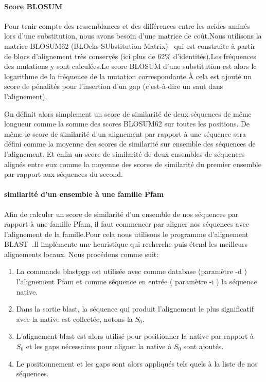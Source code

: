\paragraph{Score BLOSUM}

Pour tenir compte des ressemblances et des différences entre les acides aminés lors d'une substitution, nous avons besoin d'une matrice de coût.Nous utilisons la matrice BLOSUM62 (BLOcks SUbstitution Matrix)~\citep{refBLOSUM} qui est construite à partir de blocs d'alignement très conservés (ici plus de 62\% d'identités).Les fréquences des mutations y sont calculées.Le score BLOSUM d'une substitution est alors le logarithme de la fréquence de la mutation correspondante.À cela est ajouté un score de pénalités pour l'insertion d'un gap (c'est-à-dire un saut dans l'alignement).

On définit alors simplement un score de similarité de deux séquences de même longueur comme la somme des scores BLOSUM62 sur toutes les positions. De même le score de similarité d'un alignement par rapport à une séquence sera défini comme la moyenne des scores de similarité sur ensemble des séquences de l'alignement. Et enfin un score de similarité de deux ensembles de séquences alignés entre eux comme la moyenne des scores de similarité du premier ensemble par rapport aux séquences du second.  

\paragraph{similarité d'un ensemble à une famille Pfam}

Afin de calculer un score de similarité d'un ensemble de nos séquences par rapport à une famille Pfam, il faut commencer par aligner nos séquences avec l'alignement de la famille.Pour cela nous utilisons le programme d'alignement BLAST~\citep{refBLAST}.Il implémente une heuristique qui recherche puis étend les meilleurs alignements locaux. Nous procédons comme suit:
\begin{enumerate}
\item La commande blastpgp est utilisée avec comme database (paramètre -d ) l'alignement Pfam et comme séquence en entrée ( paramètre -i ) la séquence native. 
\item Dans la sortie blast, la séquence qui produit l'alignement le plus significatif avec la native est collectée, notons-la $S_0$. 
\item L'alignement blast est alors utilisé pour positionner la native par rapport à $S_0$ et les gaps nécessaires pour aligner la native à $S_0$ sont ajoutés.
\item Le positionnement et les gaps sont alors appliqués tels quels à la liste de nos séquences.

\end{enumerate}




